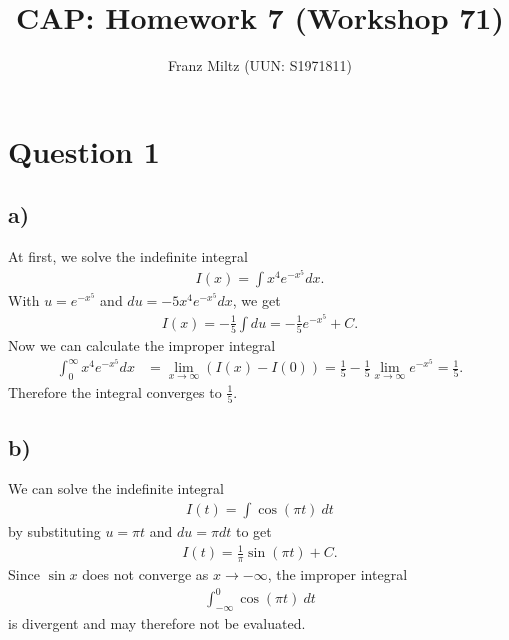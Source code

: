 \documentclass{article}
\title{CAP: Homework 7 (Workshop 71)}
\author{Franz Miltz (UUN: S1971811)}
\begin{document}
\maketitle
\section*{Question 1}
\subsection*{a)}
At first, we solve the indefinite integral
\begin{align*}
	I(x) = \int x^4e^{-x^5}dx.
\end{align*}
With $u=e^{-x^5}$ and $du=-5x^4e^{-x^5}dx$, we get
\begin{align*}
	I(x) = -\frac{1}{5}\int du = -\frac{1}{5}e^{-x^5} + C.
\end{align*}
Now we can calculate the improper integral
\begin{align*}
	\int_0^\infty x^4e^{-x^5}dx & = \lim_{x\to\infty}\left(I(x)-I(0)\right)
	= \frac{1}{5}-\frac{1}{5}\lim_{x\to\infty}e^{-x^5}=\frac{1}{5}.
\end{align*}
Therefore the integral converges to $\frac{1}{5}$.
\subsection*{b)}
We can solve the indefinite integral
\begin{align*}
	I(t) = \int \cos(\pi t)\:dt
\end{align*}
by substituting $u=\pi t$ and $du=\pi dt$ to get
\begin{align*}
	I(t) = \frac{1}{\pi} \sin(\pi t) + C.
\end{align*}
Since $\sin x$ does not converge as $x\to-\infty$, the improper integral
\begin{align*}
	\int_{-\infty}^0\cos(\pi t)\:dt
\end{align*}
is divergent and may therefore not be evaluated.
\end{document}
